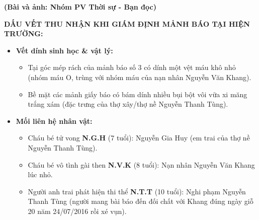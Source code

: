 \documentclass[12pt,a4paper]{article}
\begin{document}
\textbf{(Bài và ảnh: Nhóm PV Thời sự - Bạn đọc)}




\vspace{0.3cm}\noindent\textbf{\large  DẤU VẾT THU NHẬN KHI GIÁM ĐỊNH MẢNH BÁO TẠI HIỆN TRƯỜNG:}\\[0.15cm]

\begin{itemize}[leftmargin=*, itemsep=2pt, topsep=2pt, parsep=0pt]
  \item \textbf{Vết dính sinh học \& vật lý:}
\begin{itemize}[leftmargin=*, itemsep=2pt, topsep=2pt, parsep=0pt]
  \item Tại góc mép rách của mảnh báo số 3 có dính một vệt máu khô nhỏ (nhóm máu O, trùng với nhóm máu của nạn nhân Nguyễn Văn Khang).
  \item Bề mặt các mảnh giấy báo có bám dính nhiều bụi bột vôi vữa xi măng trắng xám (đặc trưng của thợ xây/thợ nề Nguyễn Thanh Tùng).
\end{itemize}
  \item \textbf{Mối liên hệ nhân vật:}
\begin{itemize}[leftmargin=*, itemsep=2pt, topsep=2pt, parsep=0pt]
  \item Cháu bé tử vong \textbf{N.G.H} (7 tuổi): Nguyễn Gia Huy (em trai của thợ nề Nguyễn Thanh Tùng).
  \item Cháu bé vô tình gài then \textbf{N.V.K} (8 tuổi): Nạn nhân Nguyễn Văn Khang lúc nhỏ.
  \item Người anh trai phát hiện thi thể \textbf{N.T.T} (10 tuổi): Nghi phạm Nguyễn Thanh Tùng (người mang bài báo đến đối chất với Khang đúng ngày giỗ 20 năm 24/07/2016 rồi xé vụn).
\end{itemize}
\end{itemize}
\end{document}
